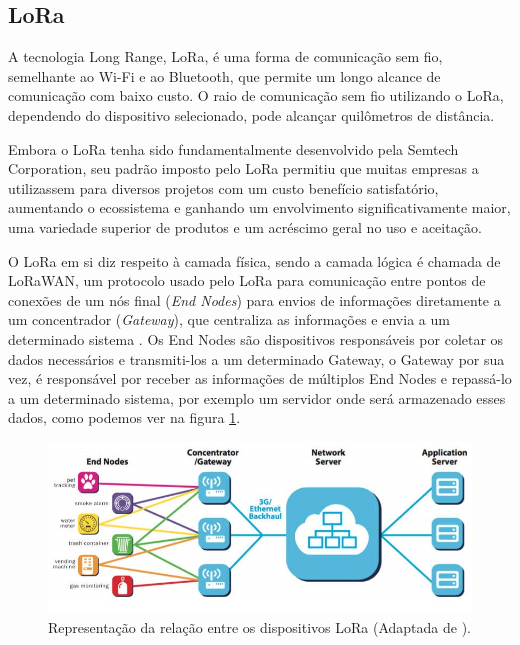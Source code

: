 \subsection{LoRa}
\label{fund:lora}
A tecnologia Long Range, LoRa, é uma forma de comunicação sem fio, semelhante ao Wi-Fi e ao Bluetooth, que permite um longo alcance de comunicação com baixo custo. O raio de comunicação sem fio utilizando o LoRa, dependendo do dispositivo selecionado, pode alcançar quilômetros de distância.

Embora o LoRa tenha sido fundamentalmente desenvolvido pela Semtech Corporation, seu padrão imposto pelo LoRa permitiu que muitas empresas a utilizassem para diversos projetos com um custo benefício satisfatório, aumentando o ecossistema e ganhando um envolvimento significativamente maior, uma variedade superior de produtos e um acréscimo geral no uso e aceitação. 

O LoRa em si diz respeito à camada física, sendo a camada lógica é chamada de LoRaWAN, um protocolo usado pelo LoRa para comunicação entre pontos de conexões de um nós final (\textit{End Nodes}) para envios de informações diretamente a um concentrador (\textit{Gateway}), que centraliza as informações e envia a um determinado sistema \cite{lora2021specification}. Os End Nodes são dispositivos responsáveis por coletar os dados necessários e transmiti-los a um determinado Gateway, o Gateway por sua vez, é responsável por receber as informações de múltiplos End Nodes e repassá-lo a um determinado sistema, por exemplo um servidor onde será armazenado esses dados, como podemos ver na figura \ref{fig:end-nodes-gateways}.

\begin{figure}[H]
  \centering
  \includegraphics[width=.80\textwidth]{assets/lora-network-architecture.png} 
  \caption{Representação da relação entre os dispositivos LoRa (Adaptada de \cite{lora2021architecture}).}
  \label{fig:end-nodes-gateways} 
\end{figure}

